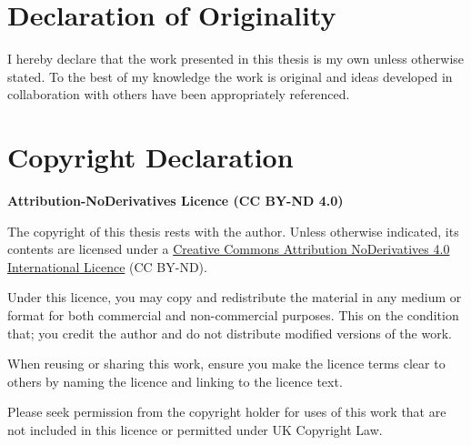 \cleardoublepage{}
{}\mtcaddchapter 
\chapter*{Declaration of Originality}
\addtocounter{counter}{-1}




I hereby declare that the work presented in this thesis is my own unless otherwise stated. To the best of my knowledge the work is original and ideas developed in collaboration with others have been appropriately referenced.


\cleardoublepage{}
{}\mtcaddchapter 
\chapter*{Copyright Declaration}
\addtocounter{counter}{-1}





\textbf{Attribution-NoDerivatives Licence (CC BY-ND 4.0)}

The copyright of this thesis rests with the author. Unless otherwise indicated, its contents are licensed under a \href{https://creativecommons.org/licenses/by-nd/4.0/}{Creative Commons Attribution NoDerivatives 4.0 International Licence}  (CC BY-ND).

Under this licence, you may copy and redistribute the material in any medium or format for both commercial and non-commercial purposes.  This on the condition that; you credit the author and do not distribute modified versions of the work.

When reusing or sharing this work, ensure you make the licence terms clear to others by naming the licence and linking to the licence text.

Please seek permission from the copyright holder for uses of this work that are not included in this licence or permitted under UK Copyright Law.
